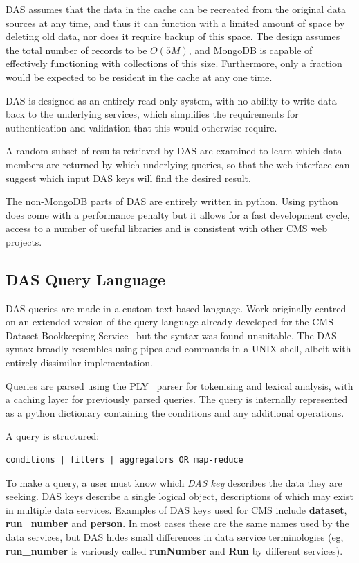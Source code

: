\documentclass[a4paper]{jpconf}
\begin{document}
DAS assumes that the data in the cache can be recreated from the original data sources at any time, and thus it can function with a limited amount of space by deleting old data, nor does it require backup of this space. The design assumes the total number of records to be $O(5M)$, and MongoDB is capable of effectively functioning with collections of this size. Furthermore,  only a fraction would be expected to be resident in the cache at any one time.

DAS is designed as an entirely read-only system, with no ability to write data back to the underlying services, which simplifies the requirements for authentication and validation that this would otherwise require.

A random subset of results retrieved by DAS are examined to learn which data members are returned by which underlying queries, so that the web interface can suggest which input DAS keys will find the desired result.

The non-MongoDB parts of DAS are entirely written in python. Using python does come with a performance penalty but it allows for a fast development cycle, access to a number of useful libraries and is consistent with other CMS web projects.

\subsection{\label{dasql}DAS Query Language}

DAS queries are made in a custom text-based language. Work originally centred on an extended version of the query language already developed for the CMS Dataset Bookkeeping Service~\cite{dbsql} but the syntax was found unsuitable. The DAS syntax broadly resembles using pipes and commands in a UNIX shell, albeit with entirely dissimilar implementation.

Queries are parsed using the PLY~\cite{ply} parser for tokenising and lexical analysis, with a caching layer for previously parsed queries. The query is internally represented as a python dictionary containing the conditions and any additional operations.

A query is structured:

\begin{verbatim}
conditions | filters | aggregators OR map-reduce 
\end{verbatim}

To make a query, a user must know which \emph{DAS key} describes the data they are seeking. DAS keys describe a single logical object, descriptions of which may exist in multiple data services. Examples of DAS keys used for CMS include \textbf{dataset}, \textbf{run\_number} and \textbf{person}. In most cases these are the same names used by the data services, but DAS hides small differences in data service terminologies (eg, \textbf{run\_number} is variously called \textbf{runNumber} and \textbf{Run} by different services).
\end{document}
